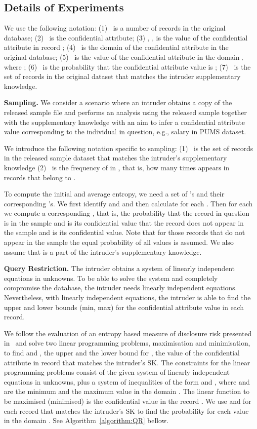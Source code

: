 \documentclass{llncs}
\begin{document}
\subsection*{Details of Experiments}

We use the following notation: (1) ~is a number of records in the original database;
(2) ~is the confidential attribute;
(3) , ,  is the value of the confidential attribute  in record ;
(4) ~is the domain of the confidential attribute  in the original database;
(5) ~is the  value of the confidential attribute in the domain , where ;
(6) ~is the probability that the confidential attribute value is ;
(7) ~is the set of records in the original dataset that matches the intruder supplementary
  knowledge.
	
\textbf{Sampling.} We consider a scenario where an intruder obtains a copy of the
released sample file and performs an analysis using the
released sample together with the supplementary knowledge with an
aim to infer a confidential attribute value corresponding to the
individual in question, e.g., salary in PUMS dataset.

We introduce the following notation specific to sampling:
(1)  ~is the set of records in the released sample dataset
  that matches the intruder's supplementary knowledge
(2) ~is the frequency of  in , that is,
  how many times  appears in records that belong to .

To compute the initial and average entropy, we need a set
of 's and their corresponding 's. We first identify
 and  and then calculate  for each
. Then for each  we compute a corresponding ,
that is, the probability that the record in question is in the
sample and  is its confidential value  that the record
does not appear in the sample and  is its confidential
value. Note that for those records that do not appear in the sample the
equal probability of all  values is assumed. We also assume
that  is a part of the intruder's supplementary
knowledge.


\textbf{Query Restriction.} The intruder obtains a system of  linearly independent
equations in  unknowns. To be able to solve the system and
completely compromise the database, the intruder needs 
linearly independent equations. Nevertheless, with 
linearly independent equations, the intruder is able to find the
upper and lower bounds (min, max) for the confidential attribute
value in each record.

We follow the evaluation of an entropy based measure of disclosure
risk presented in~\cite{Oganian-Ferrer:Posteriori03} and solve two
linear programming problems, maximisation and minimisation, to
find  and , the upper and the lower bound for , the
value of the confidential attribute  in record  that matches
the intruder's SK. The constraints for the linear programming
problems consist of the given system of  linearly independent
equations in  unknowns, plus a system of inequalities of the
form  and , where 
and  are the minimum and the maximum value in the domain
. The linear function to be maximised (minimised) is the
confidential value in the record . We use  and  for each
record that matches the intruder's SK to find the probability
 for each value  in the domain . See
Algorithm~\ref{algorithm:QR} bellow.
\end{document}
